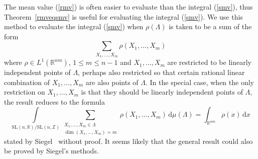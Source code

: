 \documentclass[11pt]{article}
\theoremstyle{definition}
\theoremstyle{proof}
\begin{document}
The mean value (\ref{rmv}) is often easier to evaluate than the integral (\ref{smv}), thus Theorem~\ref{rmveqsmv} is useful for evaluating the integral (\ref{smv}).
We use this method to evaluate the integral (\ref{smv}) when $\rho (\Lambda )$ is taken to be a sum of the form
\[
    \sum_{X_1, \ldots, X_m} \rho (X_1, \ldots, X_m) 
\]
where $\rho \in L^1(\mathbb{R}^{nm})$, $1\leq  m \leq n-1$ and $X_1, \ldots, X_m$ are restricted to be linearly independent points of $\Lambda$, perhaps also restricted so that certain rational linear combination of $X_1, \ldots, X_m$ are also points of $\Lambda$.
In the special case, when the only restriction on $X_1, \ldots, X_m$ is that they should be linearly independent points of $\Lambda$, the result reduces to the formula
\[
    \int\limits_{\mathrm{SL}(n,\mathbb{R})/\mathrm{SL}(n,\mathbb{Z})} \sum_{\substack{X_1, \ldots, X_m \in \Lambda \\ \dim (X_1, \ldots, X_m) = m}} \rho (X_1, \ldots, X_m) \, \mathrm{d} \mu (\Lambda ) = \int_{\mathbb{R}^{nm}} \rho (x) \, \mathrm{d} x
\]
stated by Siegel~\cite{siegel45} without proof.
It seems likely that the general result could also be proved by Siegel's methods.
\end{document}
